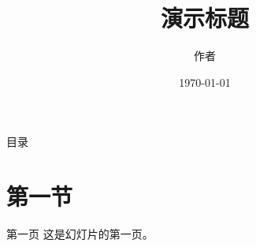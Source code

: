 \documentclass[UTF8]{ctexbeamer}
\title{演示标题}
\author{作者}
\date{\today}
\begin{document}
\begin{frame}
\titlepage
\end{frame}

\begin{frame}{目录}
\tableofcontents
\end{frame}

\section{第一节}

\begin{frame}{第一页}
这是幻灯片的第一页。
\end{frame}
\end{document}
